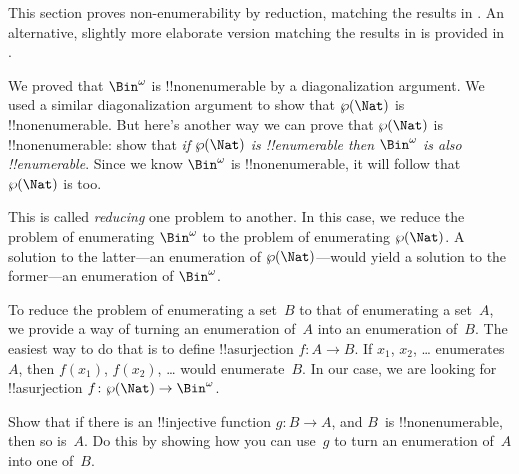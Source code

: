 \documentclass[../../../include/open-logic-section]{subfiles}
\begin{document}


\begin{editorial}
  This section proves non-enumerability by reduction, matching the
  results in . An alternative, slightly more
  elaborate version matching the results in  is
  provided in .
\end{editorial}

We proved that $\Bin^\omega$ is !!{nonenumerable} by a diagonalization
argument. We used a similar diagonalization argument to show that
$\Pow{\Nat}$ is !!{nonenumerable}. But here's another way we can prove
that $\Pow{\Nat}$ is !!{nonenumerable}: show that \emph{if
$\Pow{\Nat}$ is !!{enumerable} then $\Bin^\omega$ is also
!!{enumerable}}.  Since we know $\Bin^\omega$ is !!{nonenumerable}, it
will follow that $\Pow{\Nat}$ is too.  

This is called \emph{reducing} one problem to another. In this case,
we reduce the problem of enumerating $\Bin^\omega$ to the problem of
enumerating $\Pow{\Nat}$.  A solution to the latter---an enumeration
of $\Pow{\Nat}$---would yield a solution to the former---an
enumeration of $\Bin^\omega$.

To reduce the problem of enumerating a set~$B$ to that of enumerating
a set~$A$, we provide a way of turning an enumeration of~$A$ into an
enumeration of~$B$.  The easiest way to do that is to define
!!a{surjection} $f\colon A \to B$.  If $x_1$, $x_2$, \dots{}
enumerates~$A$, then $f(x_1)$, $f(x_2)$, \dots{} would enumerate~$B$.
In our case, we are looking for !!a{surjection} $f\colon \Pow{\Nat}
\to \Bin^\omega$.

\begin{prob}
Show that if there is an !!{injective} function $g\colon B \to A$, and
$B$~is !!{nonenumerable}, then so is~$A$. Do this by showing how you
can use~$g$ to turn an enumeration of~$A$ into one of~$B$.
\end{prob}
\end{document}
